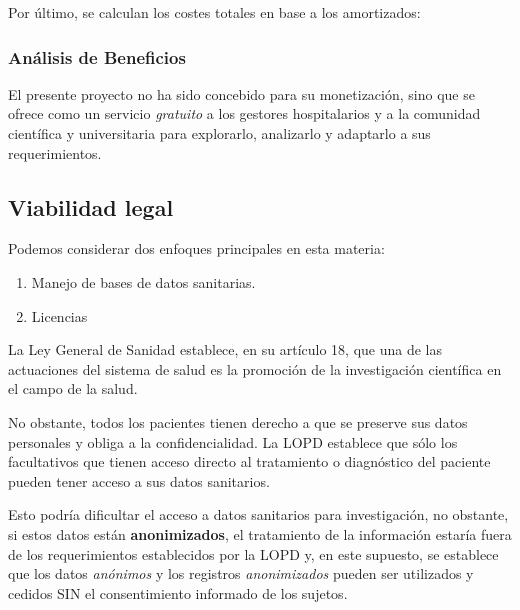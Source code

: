 Por último, se calculan los costes totales en base a los amortizados:


\subsubsection{Análisis de Beneficios}

El presente proyecto no ha sido concebido para su monetización, sino que se ofrece como un servicio \textit{gratuito} a los gestores hospitalarios y a la comunidad científica y universitaria para explorarlo, analizarlo y adaptarlo a sus requerimientos.

\newpage

\subsection{Viabilidad legal}

Podemos considerar dos enfoques principales en esta materia:
\begin{enumerate}
    \item Manejo de bases de datos sanitarias.
    \item Licencias
\end{enumerate}

La Ley General de Sanidad establece, en su artículo 18, que una de las actuaciones del sistema de salud es la promoción de la investigación científica en el campo de la salud\cite{GarridoElustondo2012InvestigacionPrimaria}.

No obstante, todos los pacientes tienen derecho a que se preserve sus datos personales y obliga a la confidencialidad. La LOPD establece que sólo los facultativos que tienen acceso directo al tratamiento o diagnóstico del paciente pueden tener acceso a sus datos sanitarios.

Esto podría dificultar el acceso a datos sanitarios para investigación, no obstante, si estos datos están \textbf{anonimizados}, el tratamiento de la información estaría fuera de los requerimientos establecidos por la LOPD y, en este supuesto, se establece que los datos \textit{anónimos} y los registros \textit{anonimizados} pueden ser utilizados y cedidos SIN el consentimiento informado de los sujetos\cite{GarridoElustondo2012InvestigacionPrimaria}.

